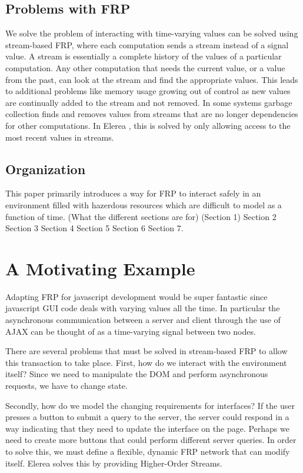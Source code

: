 \documentclass[twocolumn]{paper}
\begin{document}
\subsection{Problems with FRP}
We solve the problem of interacting with time-varying values can be solved using stream-based FRP, where each computation sends a stream instead of a signal value. A stream is essentially a complete history of the values of a particular computation. Any other computation that needs the current value, or a value from the past, can look at the stream and find the appropriate values. This leads to additional problems like memory usage growing out of control as new values are continually added to the stream and not removed. In some systems garbage collection finds and removes values from streams that are no longer dependencies for other computations. In Elerea \cite{HighOrderStreams}, this is solved by only allowing access to the most recent values in streams. 


\subsection{Organization}
This paper primarily introduces a way for FRP to interact safely in an environment filled with hazerdous resources which are difficult to model as a function of time. (What the different sections are for) (Section 1) Section 2 Section 3 Section 4 Section 5 Section 6 Section 7.

\section{A Motivating Example}
Adapting FRP for javascript development would be super fantastic since javascript GUI code deals with varying values all the time. In particular the asynchronous communication between a server and client through the use of AJAX can be thought of as a time-varying signal between two nodes. 

There are several problems that must be solved in stream-based FRP to allow this transaction to take place. First, how do we interact with the environment itself? Since we need to manipulate the DOM and perform asynchronous requests, we have to change state. 

Secondly, how do we model the changing requirements for interfaces? If the user presses a button to submit a query to the server, the server could respond in a way indicating that they need to update the interface on the page. Perhaps we need to create more buttons that could perform different server queries. In order to solve this, we must define a flexible, dynamic FRP network that can modify itself. Elerea solves this by providing Higher-Order Streams. 
\end{document}
